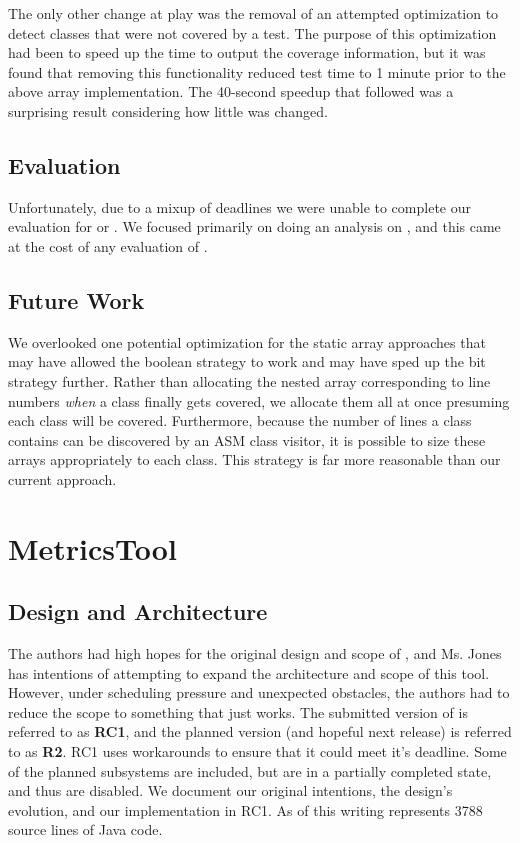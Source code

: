 The only other change at play was the removal of an attempted optimization to detect classes that were not covered by a test. The purpose of this optimization had been to speed up the time to output the coverage information, but it was found that removing this functionality reduced test time to 1 minute prior to the above array implementation. The 40-second speedup that followed was a surprising result considering how little was changed.

\subsection{Evaluation}

Unfortunately, due to a mixup of deadlines we were unable to complete our evaluation for \ct{} or \mt{}. We focused primarily on doing an analysis on \mt{}, and this came at the cost of any evaluation of \ct{}.

\subsection{Future Work}

We overlooked one potential optimization for the static array approaches that may have allowed the boolean strategy to work and may have sped up the bit strategy further. Rather than allocating the nested array corresponding to line numbers \textit{when} a class finally gets covered, we allocate them all at once presuming each class will be covered. Furthermore, because the number of lines a class contains can be discovered by an ASM class visitor, it is possible to size these arrays appropriately to each class. This strategy is far more reasonable than our current approach.

\section{MetricsTool}


\subsection{Design and Architecture}

The authors had high hopes for the original design and scope of \mt{}, and Ms. Jones has intentions of attempting to expand the architecture and scope of this tool. However, under scheduling pressure and unexpected obstacles, the authors had to reduce the scope to something that just works. The submitted version of \mt{} is referred to as \textbf{RC1}, and the planned version (and hopeful next release) is referred to as \textbf{R2}. RC1 uses workarounds to ensure that it could meet it's deadline. Some of the planned subsystems are included, but are in a partially completed state, and thus are disabled. We document our original intentions, the design's evolution, and our implementation in RC1. As of this writing \mt{} represents 3788 source lines of Java code.

